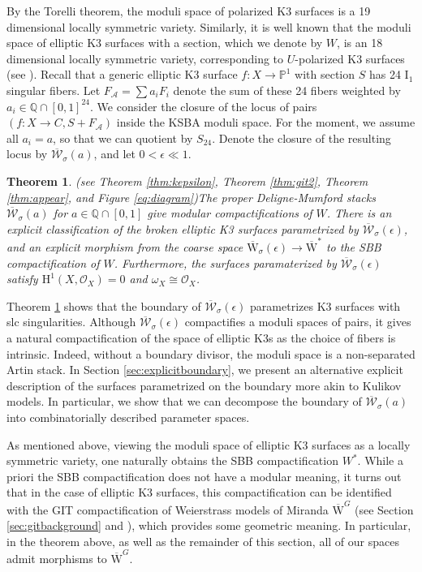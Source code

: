 \documentclass[11pt]{amsart}
\newtheorem{theorem}{Theorem}[section]
\theoremstyle{definition}
\theoremstyle{remark}
\newcommand{\bP}{{\mathbb P}}
\newcommand{\bQ}{{\mathbb Q}}
\newcommand{\calO}{\mathcal O}
\newcommand{\calA}{\mathcal A}
\newcommand{\calW}{\mathcal W}
\newcommand{\oMG}{\overline{\mathrm{W}}^G}
\newcommand{\sbb}{\overline{\mathrm{W}}^{*}}
\newcommand{\ska}{\overline{\calW}_\sigma(a)}
\newcommand{\kepsilon}{\overline{\mathcal{W}}_\sigma(\epsilon)}
\newcommand{\kepsiloncoarse}{{\overline{\mathrm{W}}}_\sigma(\epsilon)}
\begin{document}
	
	By the Torelli theorem, the moduli space of polarized K3 surfaces is a 19 dimensional locally symmetric variety. Similarly, it is well known that the moduli space of elliptic K3 surfaces with a section, which we denote by $W$, is an 18 dimensional locally symmetric variety, corresponding to $U$-polarized K3 surfaces  (see \cite{dolgachev,nikulin}). Recall that a generic elliptic K3 surface $f : X \to \bP^1$ with section $S$ has 24 $\mathrm{I}_1$ singular fibers. Let $F_{\calA} = \sum a_i F_i$ denote the sum of these 24 fibers weighted by $a_i \in \bQ \cap [0,1]^{24}$.  We consider the closure of the locus of pairs $(f: X \to C, S + F_\calA)$ inside the KSBA moduli space. For the moment, we assume all $a_i = a$, so that we can quotient by $S_{24}$. Denote the closure of the resulting locus by $\ska$, and let $0 < \epsilon \ll 1$.
	
	\begin{theorem}(see Theorem \ref{thm:kepsilon}, Theorem \ref{thm:git2}, Theorem \ref{thm:appear}, and Figure \ref{eq:diagram})\label{thm:intro2} The proper Deligne-Mumford stacks $\ska$ for $a \in \bQ \cap [0,1]$ give modular compactifications of $W$. There is an explicit classification of the broken elliptic K3 surfaces parametrized by $\kepsilon$, and an explicit morphism from the coarse space $\kepsiloncoarse \to \sbb$ to the SBB compactification of $W$. Furthermore, the surfaces paramaterized by $\kepsilon$ satisfy $\mathrm{H}^1(X, \calO_X) = 0$ and $\omega_X \cong \calO_X$. 
	\end{theorem}
	
	Theorem \ref{thm:intro2} shows that the boundary of $\kepsilon$ parametrizes K3 surfaces with  slc singularities. Although $\kepsilon$ compactifies a moduli spaces of pairs, it gives a natural compactification of the space of elliptic K3s as the choice of fibers is intrinsic. Indeed, without a boundary divisor, the moduli space is a non-separated Artin stack. In Section \ref{sec:explicitboundary}, we present an alternative explicit description of the surfaces parametrized on the boundary more akin to Kulikov models. In particular, we show that we can decompose the boundary of $\ska$ into combinatorially described parameter spaces. 
	
	
	As mentioned above, viewing the moduli space of elliptic K3 surfaces as a locally symmetric variety, one naturally obtains the SBB compactification $W^*$. While a priori the SBB compactification does not have a modular meaning, it turns out that in the case of elliptic K3 surfaces, this compactification can be identified with the GIT compactification of Weierstrass models of Miranda $\oMG$ (see Section \ref{sec:gitbackground} and \cite[Theorem 7.9]{oo}), which provides some geometric meaning. In particular, in the theorem above, as well as the remainder of this section, all of our spaces admit morphisms to $\oMG$.
	
\end{document}
